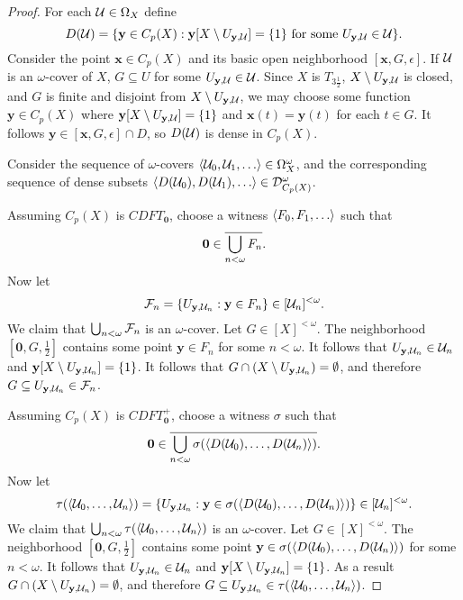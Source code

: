 \documentclass{amsart}
\renewcommand{\vec}{\mathbf}
\theoremstyle{plain}
\theoremstyle{definition}
\theoremstyle{remark}
\theoremstyle{plain}
\theoremstyle{definition}
\theoremstyle{remark}
\begin{document}
\begin{proof}
  For each \(\mathcal{U}\in\Omega_{X}\) define
  \[
    D(\mc U)
      =
    \{
      \vec y\in C_p(X)
    :
      \vec y[X\setminus U_{\vec y,\mc U}]=\{1\}
      \text{ for some }
      U_{\vec y,\mc U}\in\mc U
    \}
  .\]
  Consider the point \(\vec x\in C_p(X)\) and its basic open neighborhood
  \([\vec x,G,\epsilon]\). If \(\mathcal{U}\) is an \(\omega\)-cover
  of \(X\), \(G\subseteq U\) for some \(U_{\vec y,\mc U}\in\mc U\).
  Since \(X\) is
  \(T_{3\frac{1}{2}}\), \(X\setminus U_{\vec y,\mc U}\) is closed, and \(G\)
  is finite and disjoint from \(X\setminus U_{\vec y,\mc U}\),
  we may choose some function \(\vec y\in C_p(X)\) where
  \(\vec y[X\setminus U_{\vec y,\mc U}]=\{1\}\) and \(\vec x(t)=\vec y(t)\)
  for each \(t\in G\).
  It follows \(\vec y\in [\vec x,G,\epsilon]\cap D\), so \(D(\mathcal{U})\)
  is dense in \(C_p(X)\).

  Consider the sequence of \(\omega\)-covers
  \(\<\mc U_0,\mc U_1,\dots\>\in\Omega_X^\omega\), and the
  corresponding sequence of dense subsets
  \(\<D(\mc U_0),D(\mc U_1),\dots\>\in\mc D_{C_p(X)}^\omega\).

  Assuming \(C_p(X)\) is \(CDFT_{\vec 0}\), choose a witness
  \(\<F_0,F_1,\dots\>\) such that
  \[
    \vec 0 \in \cl{\bigcup_{n<\omega} F_n}
  .\]
  Now let
  \[
    \mc F_n
      =
    \{
      U_{\vec y,\mc U_n}
    :
      \vec y \in F_n
    \}
      \in
    [\mc U_n]^{<\omega}
  .\]
  We claim that \(\bigcup_{n<\omega}\mathcal{F}_n\) is an \(\omega\)-cover.
  Let \(G\in[X]^{<\omega}\). The neighborhood \([\vec 0,G,\frac{1}{2}]\)
  contains some point \(\vec y\in F_n\) for some \(n<\omega\). It follows
  that \(U_{\vec y,\mc U_n}\in\mc U_n\) and
  \(\vec y[X\setminus U_{\vec y,\mc U_n}]=\{1\}\). It follows that
  \(G\cap(X\setminus U_{\vec y,\mc U_n})=\emptyset\), and therefore
  \(G\subseteq U_{\vec y,\mc U_n}\in\mc F_n\).

  Assuming \(C_p(X)\) is \(CDFT_{\vec 0}^+\), choose a witness
  \(\sigma\) such that
  \[
    \vec 0
      \in
    \cl{\bigcup_{n<\omega} \sigma(\<D(\mc U_0),\dots,D(\mc U_n)\>)}
  .\]
  Now let
  \[
    \tau(\<\mc U_0,\dots,\mc U_n\>)
      =
    \{
      U_{\vec y,\mc U_n}
    :
      \vec y \in \sigma(\<D(\mc U_0),\dots,D(\mc U_n)\>)
    \}
      \in
    [\mc U_n]^{<\omega}
  .\]
  We claim that \(\bigcup_{n<\omega}\tau(\langle\mathcal{U}_0,\dots,\mathcal{U}_n\rangle)\)
  is an \(\omega\)-cover.
  Let \(G\in[X]^{<\omega}\). The neighborhood \([\vec 0,G,\frac{1}{2}]\)
  contains some point \(\vec y\in \sigma(\<D(\mc U_0),\dots,D(\mc U_n)\>)\)
  for some \(n<\omega\). It follows
  that \(U_{\vec y,\mc U_n}\in\mc U_n\) and
  \(\vec y[X\setminus U_{\vec y,\mc U_n}]=\{1\}\). As a result
  \(G\cap(X\setminus U_{\vec y,\mc U_n})=\emptyset\), and therefore
  \(G\subseteq U_{\vec y,\mc U_n}\in\mc \tau(\<\mc U_0,\dots,\mc U_n\>)\).


\end{proof}
\end{document}
